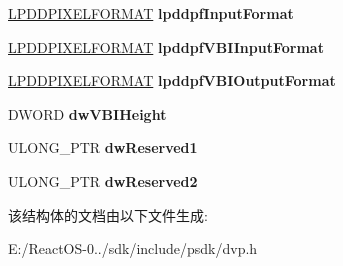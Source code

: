 \begin{DoxyCompactItemize}
\hyperlink{interfacevoid}{L\+P\+D\+D\+P\+I\+X\+E\+L\+F\+O\+R\+M\+AT} {\bfseries lpddpf\+Input\+Format}
\item 
\mbox{\label{struct___d_d_v_i_d_e_o_p_o_r_t_i_n_f_o_a07cb8e995a4b7ad0569cf1e0067690b9}} 
\hyperlink{interfacevoid}{L\+P\+D\+D\+P\+I\+X\+E\+L\+F\+O\+R\+M\+AT} {\bfseries lpddpf\+V\+B\+I\+Input\+Format}
\item 
\mbox{\label{struct___d_d_v_i_d_e_o_p_o_r_t_i_n_f_o_a57e3158e75861ebf927e11d12ea171c2}} 
\hyperlink{interfacevoid}{L\+P\+D\+D\+P\+I\+X\+E\+L\+F\+O\+R\+M\+AT} {\bfseries lpddpf\+V\+B\+I\+Output\+Format}
\item 
\mbox{\label{struct___d_d_v_i_d_e_o_p_o_r_t_i_n_f_o_a9c8656734860869ef95c219c16cbfdb8}} 
D\+W\+O\+RD {\bfseries dw\+V\+B\+I\+Height}
\item 
\mbox{\label{struct___d_d_v_i_d_e_o_p_o_r_t_i_n_f_o_aedefdfb8318f46df822bccb6512a16c8}} 
U\+L\+O\+N\+G\+\_\+\+P\+TR {\bfseries dw\+Reserved1}
\item 
\mbox{\label{struct___d_d_v_i_d_e_o_p_o_r_t_i_n_f_o_ab68a6095e254dd9aa2886c42939087b1}} 
U\+L\+O\+N\+G\+\_\+\+P\+TR {\bfseries dw\+Reserved2}
\end{DoxyCompactItemize}


该结构体的文档由以下文件生成\+:\begin{DoxyCompactItemize}
\item 
E\+:/\+React\+O\+S-\/0../sdk/include/psdk/dvp.\+h\end{DoxyCompactItemize}
